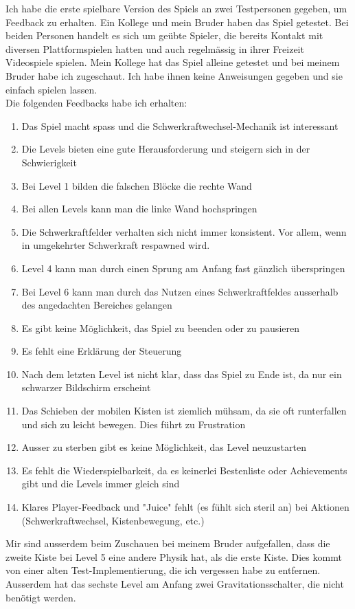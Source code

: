 \documentclass{article}
\begin{document}
Ich habe die erste spielbare Version des Spiels an zwei Testpersonen gegeben, um Feedback zu erhalten. Ein Kollege und mein Bruder haben das Spiel getestet.
Bei beiden Personen handelt es sich um geübte Spieler, die bereits Kontakt mit diversen Plattformspielen hatten und auch regelmässig in ihrer Freizeit Videospiele spielen.
Mein Kollege hat das Spiel alleine getestet und bei meinem Bruder habe ich zugeschaut. Ich habe ihnen keine Anweisungen gegeben und sie einfach spielen lassen.
\\
Die folgenden Feedbacks habe ich erhalten:
\begin{enumerate}
    \item Das Spiel macht spass und die Schwerkraftwechsel-Mechanik ist interessant
    \item Die Levels bieten eine gute Herausforderung und steigern sich in der Schwierigkeit
    \item Bei Level 1 bilden die falschen Blöcke die rechte Wand
    \item Bei allen Levels kann man die linke Wand hochspringen
    \item Die Schwerkraftfelder verhalten sich nicht immer konsistent. Vor allem, wenn in umgekehrter Schwerkraft respawned wird.
    \item Level 4 kann man durch einen Sprung am Anfang fast gänzlich überspringen
    \item Bei Level 6 kann man durch das Nutzen eines Schwerkraftfeldes ausserhalb des angedachten Bereiches gelangen
    \item Es gibt keine Möglichkeit, das Spiel zu beenden oder zu pausieren
    \item Es fehlt eine Erklärung der Steuerung
    \item Nach dem letzten Level ist nicht klar, dass das Spiel zu Ende ist, da nur ein schwarzer Bildschirm erscheint
    \item Das Schieben der mobilen Kisten ist ziemlich mühsam, da sie oft runterfallen und sich zu leicht bewegen. Dies führt zu Frustration
    \item Ausser zu sterben gibt es keine Möglichkeit, das Level neuzustarten
    \item Es fehlt die Wiederspielbarkeit, da es keinerlei Bestenliste oder Achievements gibt und die Levels immer gleich sind
    \item Klares Player-Feedback und "Juice" fehlt (es fühlt sich steril an) bei Aktionen (Schwerkraftwechsel, Kistenbewegung, etc.)
\end{enumerate}
\bigskip
Mir sind ausserdem beim Zuschauen bei meinem Bruder aufgefallen, dass die zweite Kiste bei Level 5 eine andere Physik hat, als die erste Kiste. Dies kommt von einer
alten Test-Implementierung, die ich vergessen habe zu entfernen. Ausserdem hat das sechste Level am Anfang zwei Gravitationsschalter, die nicht benötigt werden.
\end{document}
